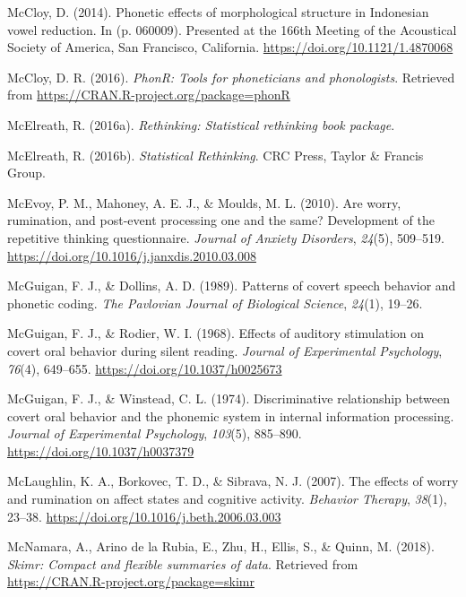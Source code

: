 \documentclass[a4paper,12pt,twoside,onecolumn,openright,final,oldfontcommands]{memoir}
\begin{document}
\leavevmode\hypertarget{ref-mccloy_phonetic_2014}{}%
McCloy, D. (2014). Phonetic effects of morphological structure in Indonesian vowel reduction. In (p. 060009). Presented at the 166th Meeting of the Acoustical Society of America, San Francisco, California. \url{https://doi.org/10.1121/1.4870068}

\leavevmode\hypertarget{ref-R-phonR}{}%
McCloy, D. R. (2016). \emph{PhonR: Tools for phoneticians and phonologists}. Retrieved from \url{https://CRAN.R-project.org/package=phonR}

\leavevmode\hypertarget{ref-R-rethinking}{}%
McElreath, R. (2016a). \emph{Rethinking: Statistical rethinking book package}.

\leavevmode\hypertarget{ref-mcelreath_statistical_2016}{}%
McElreath, R. (2016b). \emph{Statistical Rethinking}. CRC Press, Taylor \& Francis Group.

\leavevmode\hypertarget{ref-McEvoy2010}{}%
McEvoy, P. M., Mahoney, A. E. J., \& Moulds, M. L. (2010). Are worry, rumination, and post-event processing one and the same? Development of the repetitive thinking questionnaire. \emph{Journal of Anxiety Disorders}, \emph{24}(5), 509--519. \url{https://doi.org/10.1016/j.janxdis.2010.03.008}

\leavevmode\hypertarget{ref-mcguigan_patterns_1989}{}%
McGuigan, F. J., \& Dollins, A. D. (1989). Patterns of covert speech behavior and phonetic coding. \emph{The Pavlovian Journal of Biological Science}, \emph{24}(1), 19--26.

\leavevmode\hypertarget{ref-mcguigan_effects_1968}{}%
McGuigan, F. J., \& Rodier, W. I. (1968). Effects of auditory stimulation on covert oral behavior during silent reading. \emph{Journal of Experimental Psychology}, \emph{76}(4), 649--655. \url{https://doi.org/10.1037/h0025673}

\leavevmode\hypertarget{ref-mcguigan_discriminative_1974}{}%
McGuigan, F. J., \& Winstead, C. L. (1974). Discriminative relationship between covert oral behavior and the phonemic system in internal information processing. \emph{Journal of Experimental Psychology}, \emph{103}(5), 885--890. \url{https://doi.org/10.1037/h0037379}

\leavevmode\hypertarget{ref-mclaughlin_effects_2007}{}%
McLaughlin, K. A., Borkovec, T. D., \& Sibrava, N. J. (2007). The effects of worry and rumination on affect states and cognitive activity. \emph{Behavior Therapy}, \emph{38}(1), 23--38. \url{https://doi.org/10.1016/j.beth.2006.03.003}

\leavevmode\hypertarget{ref-R-skimr}{}%
McNamara, A., Arino de la Rubia, E., Zhu, H., Ellis, S., \& Quinn, M. (2018). \emph{Skimr: Compact and flexible summaries of data}. Retrieved from \url{https://CRAN.R-project.org/package=skimr}
\end{document}
